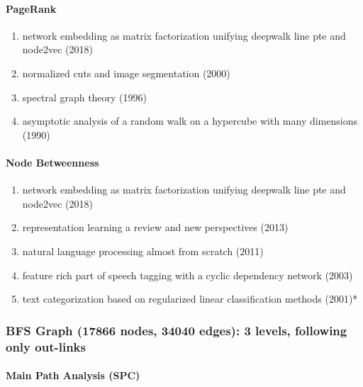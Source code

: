 \documentclass[lettepaper,]{article}
\providecommand{\tightlist}{%
  \setlength{\itemsep}{0pt}\setlength{\parskip}{0pt}}
\let\oldparagraph\paragraph
\renewcommand{\paragraph}[1]{\oldparagraph{#1}\mbox{}}
\begin{document}
\hypertarget{pagerank-5}{%
\paragraph{PageRank}\label{pagerank-5}}

\begin{enumerate}
\def\labelenumi{\arabic{enumi}.}
\tightlist
\item
  network embedding as matrix factorization unifying deepwalk line pte
  and node2vec (2018)
\item
  normalized cuts and image segmentation (2000)
\item
  spectral graph theory (1996)
\item
  asymptotic analysis of a random walk on a hypercube with many
  dimensions (1990)
\end{enumerate}

\hypertarget{node-betweenness-2}{%
\paragraph{Node Betweenness}\label{node-betweenness-2}}

\begin{enumerate}
\def\labelenumi{\arabic{enumi}.}
\tightlist
\item
  network embedding as matrix factorization unifying deepwalk line pte
  and node2vec (2018)
\item
  representation learning a review and new perspectives (2013)
\item
  natural language processing almost from scratch (2011)
\item
  feature rich part of speech tagging with a cyclic dependency network
  (2003)
\item
  text categorization based on regularized linear classification methods
  (2001)*
\end{enumerate}

\hypertarget{bfs-graph-17866-nodes-34040-edges-3-levels-following-only-out-links}{%
\subsubsection{BFS Graph (17866 nodes, 34040 edges): 3 levels, following
only
out-links}\label{bfs-graph-17866-nodes-34040-edges-3-levels-following-only-out-links}}

\hypertarget{main-path-analysis-spc-3}{%
\paragraph{Main Path Analysis (SPC)}\label{main-path-analysis-spc-3}}
\end{document}
